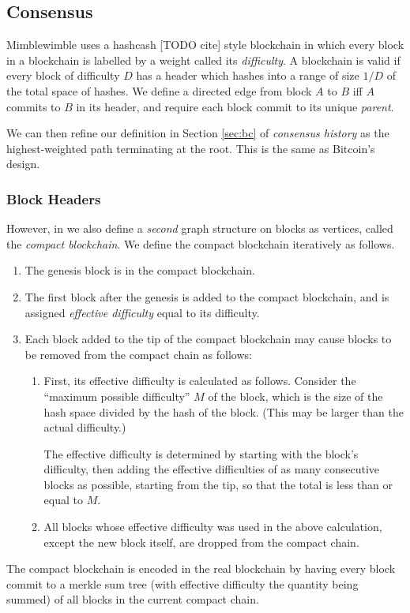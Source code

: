\documentclass[letterpaper]{article}
\begin{document}
\subsection{Consensus\label{sec:consensus}}

Mimblewimble uses a hashcash [TODO cite] style blockchain in which every
block in a blockchain is labelled by a weight called its \emph{difficulty}.
A blockchain is valid if every block of difficulty $D$ has a header which
hashes into a range of size $1/D$ of the total space of hashes. We define
a directed edge from block $A$ to $B$ iff $A$ commits to $B$ in its header,
and require each block commit to its unique \emph{parent}.

We can then refine our definition in Section \ref{sec:bc} of \emph{consensus
history} as the highest-weighted path terminating at the root. This is the
same as Bitcoin's design.

\subsubsection{Block Headers}

However, in we also define a \emph{second} graph structure on blocks as
vertices, called the \emph{compact blockchain}. We define the compact
blockchain iteratively as follows.
\begin{enumerate}
\item The genesis block is in the compact blockchain.
\item The first block after the genesis is added to the compact blockchain,
and is assigned \emph{effective difficulty} equal to its difficulty.
\item Each block added to the tip of the compact blockchain may cause
blocks to be removed from the compact chain as follows: 
\begin{enumerate}
\item First, its effective difficulty is calculated as follows. Consider
the ``maximum possible difficulty'' $M$ of the block, which is the size
of the hash space divided by the hash of the block. (This may be larger
than the actual difficulty.)

The effective difficulty is determined by starting with the block's
difficulty, then adding the effective difficulties of as many
consecutive blocks as possible, starting from the tip, so that the total
is less than or equal to $M$.

\item All blocks whose effective difficulty was used in the above calculation,
except the new block itself, are dropped from the compact chain.
\end{enumerate}
\end{enumerate}
The compact blockchain is encoded in the real blockchain by having every
block commit to a merkle sum tree (with effective difficulty the quantity
being summed) of all blocks in the current compact chain. 
\end{document}
